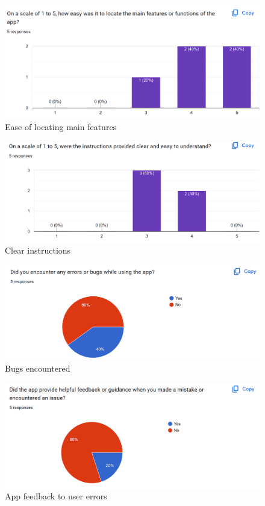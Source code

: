 \documentclass[12pt, titlepage]{article}
\begin{document}
\begin{figure}[H]
    \centering
    \includegraphics[width=1\linewidth]{Usability_1.png}
    \caption{Ease of locating main features}
    \label{fig: Ease of locating main features}
\end{figure}

\begin{figure}[H]
    \centering
    \includegraphics[width=1\linewidth]{Usability_2.png}
    \caption{Clear instructions}
    \label{fig: Clear instructions}
\end{figure}

\begin{figure}[H]
    \centering
    \includegraphics[width=1\linewidth]{Usability_3.png}
    \caption{Bugs encountered}
    \label{fig: Bugs encountered}
\end{figure}

\begin{figure}[H]
    \centering
    \includegraphics[width=1\linewidth]{Usability_4.png}
    \caption{App feedback to user errors}
    \label{fig: App feedback to user errors}
\end{figure}
\end{document}
